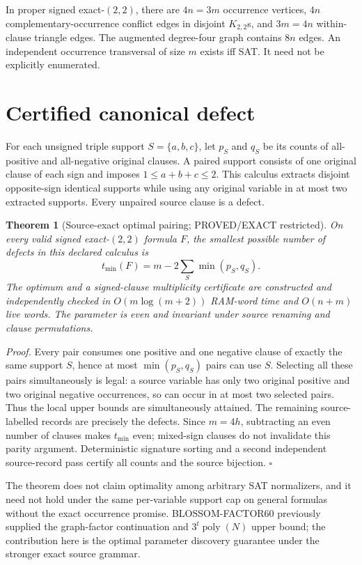 \documentclass[11pt]{article}
\newtheorem{theorem}{Theorem}
\begin{document}
In proper signed exact-$(2,2)$, there are $4n=3m$ occurrence vertices, $4n$ complementary-occurrence conflict edges in disjoint $K_{2,2}$s, and $3m=4n$ within-clause triangle edges. The augmented degree-four graph contains $8n$ edges. An independent occurrence transversal of size $m$ exists iff SAT. It need not be explicitly enumerated.

\section{Certified canonical defect}
For each unsigned triple support $S=\{a,b,c\}$, let $p_S$ and $q_S$ be its counts of all-positive and all-negative original clauses. A paired support consists of one original clause of each sign and imposes $1\le a+b+c\le2$. This calculus extracts disjoint opposite-sign identical supports while using any original variable in at most two extracted supports. Every unpaired source clause is a defect.

\begin{theorem}[Source-exact optimal pairing; PROVED/EXACT restricted]
On every valid signed exact-$(2,2)$ formula $F$, the smallest possible number of defects in this declared calculus is
\[
t_{\min}(F)=m-2\sum_S\min(p_S,q_S).
\]
The optimum and a signed-clause multiplicity certificate are constructed and independently checked in $O(m\log(m+2))$ RAM-word time and $O(n+m)$ live words. The parameter is even and invariant under source renaming and clause permutations.
\end{theorem}
\noindent\emph{Proof.} Every pair consumes one positive and one negative clause of exactly the same support $S$, hence at most $\min(p_S,q_S)$ pairs can use $S$. Selecting all these pairs simultaneously is legal: a source variable has only two original positive and two original negative occurrences, so can occur in at most two selected pairs. Thus the local upper bounds are simultaneously attained. The remaining source-labelled records are precisely the defects. Since $m=4h$, subtracting an even number of clauses makes $t_{\min}$ even; mixed-sign clauses do not invalidate this parity argument. Deterministic signature sorting and a second independent source-record pass certify all counts and the source bijection. \hfill$\square$

The theorem does not claim optimality among arbitrary SAT normalizers, and it need not hold under the same per-variable support cap on general formulas without the exact occurrence promise. BLOSSOM-FACTOR60 previously supplied the graph-factor continuation and $3^t\operatorname{poly}(N)$ upper bound; the contribution here is the optimal parameter discovery guarantee under the stronger exact source grammar.
\end{document}
